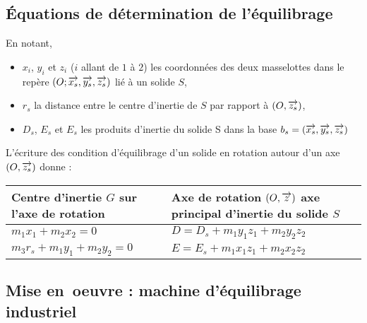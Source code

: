 \subsection{Équations de détermination de l'équilibrage}

\begin{definition}

En notant,
\begin{itemize}
\item $x_i$, $y_i$ et $z_i$ ($i$ allant de $1$ à $2$) les coordonnées des deux masselottes dans le repère $\left(O;\overrightarrow{x_s},\overrightarrow{y_s},\overrightarrow{z_s} \right)$ lié à un solide $S$,
\item $r_s$ la distance entre le centre d'inertie de $S$ par rapport à $\left(O,\overrightarrow{{z}_s}\right)$, 
\item $D_s$, $E_s$ et $E_s$ les produits d'inertie du solide S dans la base $b_s=\left(\overrightarrow{{x}_s},\overrightarrow{{y}_s},\overrightarrow{{z}_s} \right)$
\end{itemize}
L'écriture des condition d'équilibrage d'un solide en rotation autour d'un axe $\left(O,\overrightarrow{{z}_s}\right)$ donne : 

\begin{tabular}{|p{6.5cm}|p{6.5cm}|}
\hline 
\textbf{Centre d'inertie $G$ sur l'axe de rotation} & \textbf{Axe de rotation $\left(O,\overrightarrow{{z}}\right)$ axe principal d'inertie du solide $S$} \\ 
\hline 
$m_1 x_1+m_2 x_2=0$
&
$D=D_s+m_1 y_1 z_1+ m_2 y_2 z_2$
\\ 
$m_3 r_s+m_1 y_1+m_2 y_2=0$
&
$E=E_s+m_1 x_1 z_1+m_2 x_2 z_2$\\
\hline 
\end{tabular} 

\end{definition}

\subsection{Mise en\ oe{}uvre : machine d'équilibrage industriel}

